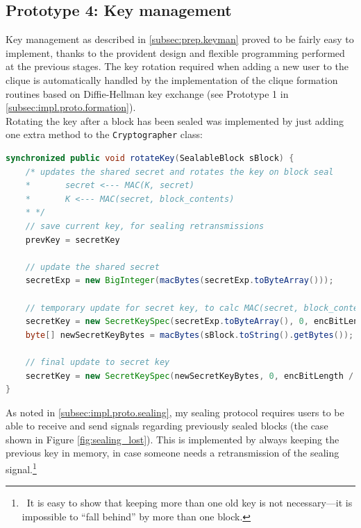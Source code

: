 \documentclass[a4paper, twoside, 12pt]{report}
\begin{document}
\subsection{Prototype 4: Key management}
Key management as described in \cref{subsec:prep.keyman} proved to be fairly easy to implement, thanks to the provident design and flexible programming performed at the previous stages. The key rotation required when adding a new user to the clique is automatically handled by the implementation of the clique formation routines based on Diffie-Hellman key exchange (see Prototype 1 in \cref{subsec:impl.proto.formation}). \\

Rotating the key after a block has been sealed was implemented by just adding one extra method to the \texttt{Cryptographer} class:

\begin{lstlisting}[language=Java, columns=fullflexible, basicstyle=\scriptsize\ttfamily]
synchronized public void rotateKey(SealableBlock sBlock) {
    /* updates the shared secret and rotates the key on block seal
    *       secret <--- MAC(K, secret)
    *       K <--- MAC(secret, block_contents)
    * */ 
    // save current key, for sealing retransmissions
    prevKey = secretKey
    
    // update the shared secret
    secretExp = new BigInteger(macBytes(secretExp.toByteArray()));

    // temporary update for secret key, to calc MAC(secret, block_content)
    secretKey = new SecretKeySpec(secretExp.toByteArray(), 0, encBitLength / 8, encAlgo);
    byte[] newSecretKeyBytes = macBytes(sBlock.toString().getBytes());

    // final update to secret key
    secretKey = new SecretKeySpec(newSecretKeyBytes, 0, encBitLength / 8, encAlgo);
}
\end{lstlisting}
As noted in \cref{subsec:impl.proto.sealing}, my sealing protocol requires users to be able to receive and send signals regarding previously sealed blocks (the case shown in Figure \ref{fig:sealing_lost}). This is implemented by always keeping the previous key in memory, in case someone needs a retransmission of the sealing signal.\footnote{~It is easy to show that keeping more than one old key is not necessary---it is impossible to ``fall behind'' by more than one block.}

\restoregeometry
\end{document}
